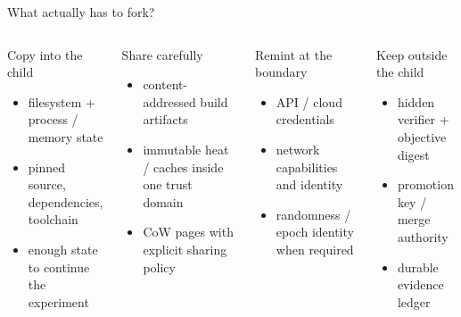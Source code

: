 \begin{frame}{What actually has to fork?}
\small
\begin{columns}[T,onlytextwidth]
\begin{block}{Copy into the child}
\begin{itemize}
  \item filesystem + process / memory state
  \item pinned source, dependencies, toolchain
  \item enough state to continue the experiment
\end{itemize}
\end{block}
\begin{block}{Share carefully}
\begin{itemize}
  \item content-addressed build artifacts
  \item immutable heat / caches inside one trust domain
  \item CoW pages with explicit sharing policy
\end{itemize}
\end{block}
\begin{block}{Remint at the boundary}
\begin{itemize}
  \item API / cloud credentials
  \item network capabilities and identity
  \item randomness / epoch identity when required
\end{itemize}
\end{block}
\begin{block}{Keep outside the child}
\begin{itemize}
  \item hidden verifier + objective digest
  \item promotion key / merge authority
  \item durable evidence ledger
\end{itemize}
\end{block}
\end{columns}
\vspace{0.3em}
\centering\Large {}
\end{frame}

